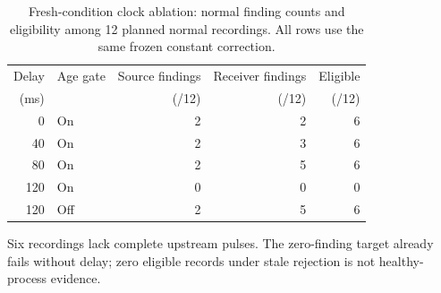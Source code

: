 \begin{table}[t]
\caption{Fresh-condition clock ablation: normal finding counts and eligibility among 12 planned normal recordings. All rows use the same frozen constant correction.}
\label{tab:clock}
\centering\small
\begin{tabular}{rlrrr}
\toprule
Delay & Age gate & Source findings & Receiver findings & Eligible\\
(ms) & & (/12) & (/12) & (/12)\\
\midrule
0 & On & 2 & 2 & 6\\
40 & On & 2 & 3 & 6\\
80 & On & 2 & 5 & 6\\
120 & On & 0 & 0 & 0\\
120 & Off & 2 & 5 & 6\\
\bottomrule
\end{tabular}
\par\smallskip\footnotesize Six recordings lack complete upstream pulses. The zero-finding target already fails without delay; zero eligible records under stale rejection is not healthy-process evidence.
\end{table}
